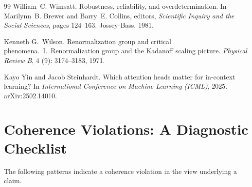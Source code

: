 \documentclass{article}
\begin{document}
\begin{thebibliography}{99}
William~C. Wimsatt.
\newblock Robustness, reliability, and overdetermination.
\newblock In Marilynn~B. Brewer and Barry~E. Collins, editors, \emph{Scientific
  Inquiry and the Social Sciences}, pages 124--163. Jossey-Bass, 1981.

Kenneth G.\ Wilson.
\newblock Renormalization group and critical phenomena.\ {I}.\ Renormalization
  group and the {Kadanoff} scaling picture.
\newblock \emph{Physical Review B}, 4 (9): 3174--3183, 1971.

Kayo Yin and Jacob Steinhardt.
\newblock Which attention heads matter for in-context learning?
\newblock In \emph{International Conference on Machine Learning (ICML)}, 2025.
\newblock arXiv:2502.14010.

\end{thebibliography}

\newpage
\appendix
{}
\section{Coherence Violations: A Diagnostic Checklist}\label{app:checklist}

The following patterns indicate a coherence violation in the view
underlying a claim.
\end{document}
